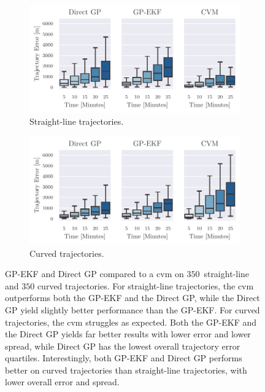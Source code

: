 \begin{figure}
    \centering
    \begin{subfigure}{\textwidth}
        \includegraphics[width=\textwidth]{figures/straight_line_stats/both_vs_cvm.pdf}

        \caption{Straight-line trajectories.}
        \label{fig:stats_curved_both_vs_cvm}
    \end{subfigure}
    \begin{subfigure}{\textwidth}
        \includegraphics[width=\textwidth]{figures/curved_line_stats/both_vs_cvm.pdf}
        \caption{Curved trajectories.}
        \label{fig:stats_straight_both_vs_cvm}
    \end{subfigure}
    \caption{GP-EKF and Direct GP compared to a \acrshort{cvm} on $350$ straight-line and $350$ curved trajectories. For straight-line trajectories, the \acrshort{cvm} outperforms both the GP-EKF and the Direct GP, while the Direct GP yield slightly better performance than the GP-EKF. For curved trajectories, the \acrshort{cvm} struggles as expected. Both the GP-EKF and the Direct GP yields far better results with lower error and lower spread, while Direct GP has the lowest overall trajectory error quartiles. Interestingly, both GP-EKF and Direct GP performs better on curved trajectories than straight-line trajectories, with lower overall error and spread.}
    \label{fig:stats_both_vs_cvm}
\end{figure}



